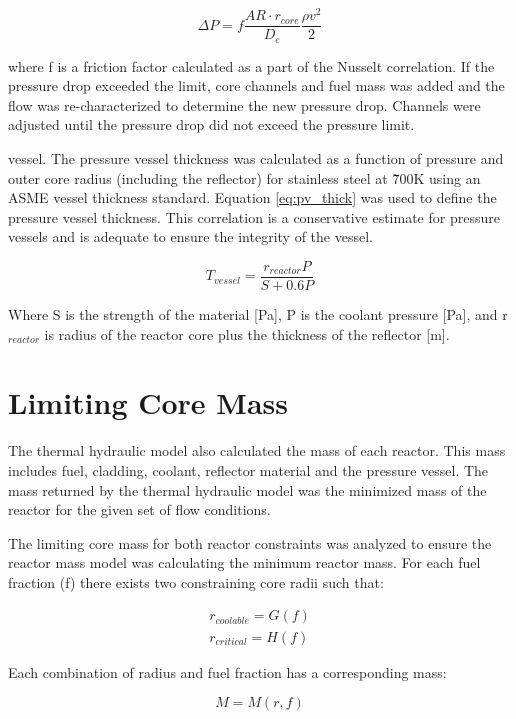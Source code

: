 \begin{equation}
    \Delta P = f \frac{AR\cdot r_{core}}{D_e} \frac{\rho v^2}{2}
\end{equation}

where f is a friction factor calculated as a part of the Nusselt correlation. If the
pressure drop exceeded the limit, core channels and fuel mass was added and the
flow was re-characterized to determine the new pressure drop. Channels were adjusted
until the pressure drop did not exceed the pressure limit.

vessel. The pressure vessel thickness was calculated as a function of pressure
and outer core radius (including the reflector) for stainless steel at \~700K
using an ASME vessel thickness standard. Equation \ref{eq:pv_thick} was used to
define the pressure vessel thickness. This correlation is a conservative
estimate for pressure vessels and is adequate to ensure the integrity of the
vessel.

\begin{equation}
    T_{vessel} = \frac{r_{reactor}P}{S + 0.6P}
    \label{eq:pv_thick}
\end{equation}

Where S is the strength of the material [Pa], P is the coolant pressure [Pa],
and r$_{reactor}$ is radius of the reactor core plus the thickness of the
reflector [m].

\section{Limiting Core Mass}
The thermal hydraulic model also calculated the mass of each reactor. This
mass includes fuel, cladding, coolant, reflector material and the pressure
vessel. The mass returned by the thermal hydraulic model was the minimized mass
of the reactor for the given set of flow conditions.

The limiting core mass for both reactor constraints was analyzed to ensure the
reactor mass model was calculating the minimum reactor mass. For each fuel
fraction (f) there exists two constraining core radii such that:

\begin{align}
    r_{coolable} = G(f) \\
    r_{critical} = H(f)
\end{align}

Each combination of radius and fuel fraction has a corresponding mass:

\begin{equation}
    M = M(r, f)
\end{equation}

